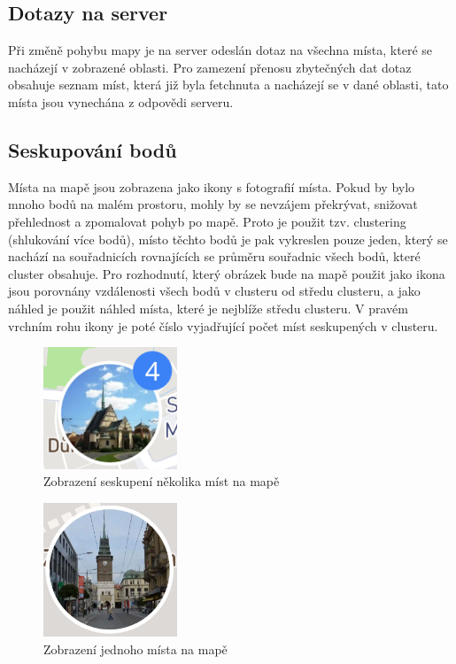 \documentclass[12pt, a4paper,
 twoside,        %
 openright
]{report}
\begin{document}
    \subsection{Dotazy na server}
    Při změně pohybu mapy je na server odeslán dotaz na všechna místa, které se nacházejí v zobrazené oblasti. Pro zamezení přenosu zbytečných dat dotaz obsahuje seznam míst, která již byla fetchnuta a nacházejí se v dané oblasti, tato místa jsou vynechána z odpovědi serveru.
    \subsection{Seskupování bodů}
    Místa na mapě jsou zobrazena jako ikony s fotografií místa. Pokud by bylo mnoho bodů na malém prostoru, mohly by se nevzájem překrývat, snižovat přehlednost a zpomalovat pohyb po mapě. Proto je použit tzv. clustering (shlukování více bodů), místo těchto bodů je pak vykreslen pouze jeden, který se nachází na souřadnicích rovnajících se průměru souřadnic všech bodů, které cluster obsahuje. Pro rozhodnutí, který obrázek bude na mapě použit jako ikona jsou porovnány vzdálenosti všech bodů v clusteru od středu clusteru, a jako náhled je použit náhled místa, které je nejblíže středu clusteru. V pravém vrchním rohu ikony je poté číslo vyjadřující počet míst seskupených v clusteru.

\begin{figure}[h]
	\centering
	\includegraphics[width=4cm]{images/places_cluster.png}
	\caption{Zobrazení seskupení několika míst na mapě}
\end{figure}
\begin{figure}[h]
	\centering
	\includegraphics[width=4cm]{images/place.png}
	\caption{Zobrazení jednoho místa na mapě}
\end{figure}
\end{document}
